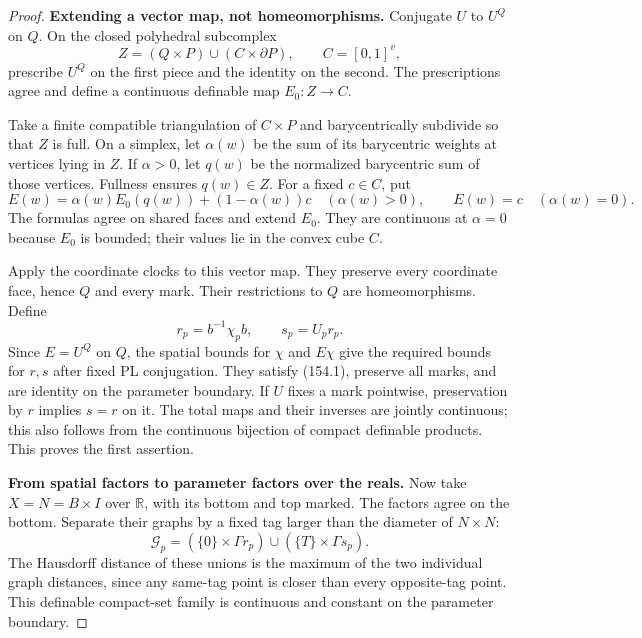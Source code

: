 \begin{proof}
\textbf{Extending a vector map, not homeomorphisms.}\quad
Conjugate $U$ to $U^Q$ on $Q$. On the closed polyhedral
subcomplex
\[
 Z=(Q\times P)\cup(C\times\partial P),
 \qquad C=[0,1]^v,
\]
prescribe $U^Q$ on the first piece and the identity on the
second. The prescriptions agree and define a continuous
definable map $E_0:Z\to C$.

Take a finite compatible triangulation of $C\times P$ and
barycentrically subdivide so that $Z$ is full. On a simplex,
let $\alpha(w)$ be the sum of its barycentric weights at
vertices lying in $Z$. If $\alpha>0$, let $q(w)$ be the
normalized barycentric sum of those vertices. Fullness
ensures $q(w)\in Z$. For a fixed $c\in C$, put
\[
 E(w)=\alpha(w)E_0(q(w))+(1-\alpha(w))c
      \quad(\alpha(w)>0),\qquad E(w)=c\quad(\alpha(w)=0).
 \tag{154.10}
\]
The formulas agree on shared faces and extend $E_0$.
They are continuous at $\alpha=0$ because $E_0$ is bounded;
their values lie in the convex cube $C$.

Apply the coordinate clocks to this vector map. They
preserve every coordinate face, hence $Q$ and every mark.
Their restrictions to $Q$ are homeomorphisms. Define
\[
 r_p=b^{-1}\chi_pb,\qquad s_p=U_pr_p.
 \tag{154.11}
\]
Since $E=U^Q$ on $Q$, the spatial bounds for $\chi$ and
$E\chi$ give the required bounds for $r,s$ after fixed
PL conjugation. They satisfy (154.1), preserve all marks,
and are identity on the parameter boundary. If $U$ fixes
a mark pointwise, preservation by $r$ implies $s=r$ on it.
The total maps and their inverses are jointly continuous;
this also follows from the continuous bijection of compact
definable products. This proves the first assertion.

\textbf{From spatial factors to parameter factors over the reals.}\quad
Now take $X=N=B\times I$ over $\mathbb R$, with its bottom
and top marked. The factors agree on the bottom. Separate
their graphs by a fixed tag larger than the diameter of
$N\times N$:
\[
 \mathcal G_p=(\{0\}\times\Gamma r_p)
                   \cup(\{T\}\times\Gamma s_p).
 \tag{154.12}
\]
The Hausdorff distance of these unions is the maximum of
the two individual graph distances, since any same-tag
point is closer than every opposite-tag point.
This definable compact-set family is continuous and
constant on the parameter boundary.


\end{proof}
